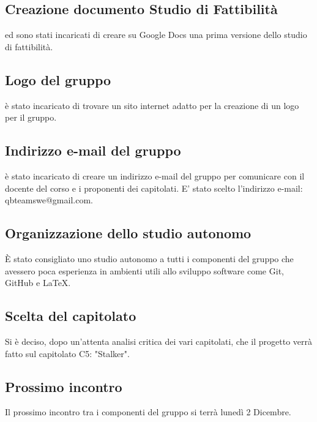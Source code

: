 \subsection{Creazione documento Studio di Fattibilità}
\AT{} ed \CE{} sono stati incaricati di creare su Google Docs una prima versione dello studio di fattibilità.

\subsection{Logo del gruppo}
\DF{} è stato incaricato di trovare un sito internet adatto per la creazione di un logo per il gruppo.

\subsection{Indirizzo e-mail del gruppo}
\SE{} è stato incaricato di creare un indirizzo e-mail del gruppo per comunicare con il docente del corso e i proponenti dei capitolati.
E' stato scelto l'indirizzo e-mail: qbteamswe@gmail.com.

\subsection{Organizzazione dello studio autonomo}
È stato consigliato uno studio autonomo a tutti i componenti del gruppo che avessero poca esperienza in ambienti utili allo sviluppo software come Git, GitHub e \LaTeX.\\

\subsection{Scelta del capitolato}
Si è deciso, dopo un'attenta analisi critica dei vari capitolati, che il progetto verrà fatto sul capitolato C5: "Stalker".

\subsection{Prossimo incontro}
Il prossimo incontro tra i componenti del gruppo si terrà lunedì 2 Dicembre.
\clearpage